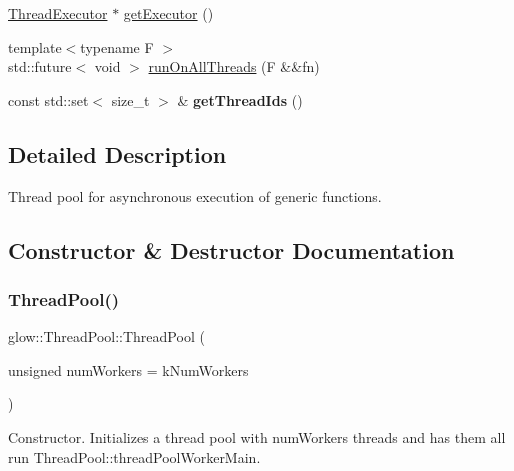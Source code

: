 \begin{DoxyCompactItemize}
\hyperlink{classglow_1_1_thread_executor}{Thread\+Executor} $\ast$ \hyperlink{classglow_1_1_thread_pool_a1da371b53981316f8e0ebd66efd43cd1}{get\+Executor} ()
\item 
{\footnotesize template$<$typename F $>$ }\\std\+::future$<$ void $>$ \hyperlink{classglow_1_1_thread_pool_ac75f4d3a956beb63705644d9b867a45a}{run\+On\+All\+Threads} (F \&\&fn)
\item 
\mbox{\label{classglow_1_1_thread_pool_a0afcdede97273797947323fdf39a1726}} 
const std\+::set$<$ size\+\_\+t $>$ \& {\bfseries get\+Thread\+Ids} ()
\end{DoxyCompactItemize}


\subsection{Detailed Description}
Thread pool for asynchronous execution of generic functions. 

\subsection{Constructor \& Destructor Documentation}
\mbox{\label{classglow_1_1_thread_pool_ab10100ee1172c075fd38583f1a194080}} 
\subsubsection{\texorpdfstring{Thread\+Pool()}{ThreadPool()}}
{\footnotesize\ttfamily glow\+::\+Thread\+Pool\+::\+Thread\+Pool (\begin{DoxyParamCaption}\item[{unsigned}]{num\+Workers = {\ttfamily kNumWorkers} }\end{DoxyParamCaption})}

Constructor. Initializes a thread pool with {\ttfamily num\+Workers} threads and has them all run Thread\+Pool\+::thread\+Pool\+Worker\+Main. \mbox{\label{classglow_1_1_thread_pool_aa2b1e452ea6045331c2f26b247558dd5}} 
